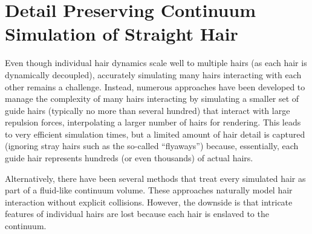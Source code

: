 
\chapter{Detail Preserving Continuum Simulation of Straight Hair}
%


Even though individual hair dynamics scale well to multiple hairs (as each hair
is dynamically decoupled), accurately simulating many hairs interacting with
each other remains a challenge.  Instead, numerous approaches have been
developed to manage the complexity of many hairs interacting by simulating a
smaller set of guide hairs (typically no more than several hundred) that
interact with large repulsion forces, interpolating a larger number of hairs for
rendering. This leads to very efficient simulation times, but a limited amount
of hair detail is captured (ignoring stray hairs such as the
so-called ``flyaways'') because, essentially, each guide hair represents
hundreds (or even thousands) of actual hairs.

Alternatively, there have been several methods that treat every simulated hair
as part of a fluid-like continuum volume. These approaches naturally model hair
interaction without explicit collisions. However, the downside is that intricate
features of individual hairs are lost because each hair is enslaved to the
continuum.



